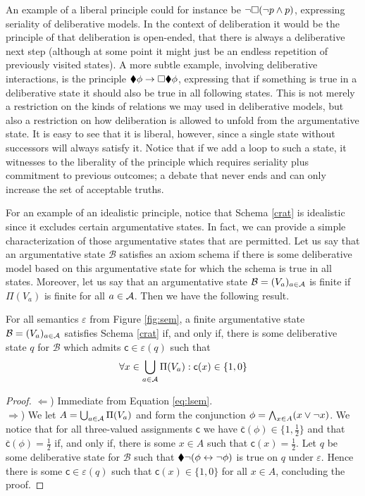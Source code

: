 \documentclass[greybox]{svmult}
\renewcommand{\bar}[1]{\overline{#1}}
\newcommand{\clab}{\mathsf c}
\newcommand{\views}{\mathcal B}
\newcommand{\sem}{\varepsilon}
\begin{document}
An example of a liberal principle could for instance be $\neg \square (\neg p \land p)$, expressing seriality of deliberative models. In the context of deliberation it would be the principle of that deliberation is open-ended, that there is always a deliberative next step (although at some point it might just be an endless repetition of previously visited states). A more subtle example, involving deliberative interactions, is the principle $\blacklozenge \phi \to \square \blacklozenge \phi$, expressing that if something is true in a deliberative state it should also be true in all following states. This is not merely a restriction on the kinds of relations we may used in deliberative models, but also a restriction on how deliberation is allowed to unfold from the argumentative state. It is easy to see that it is liberal, however, since a single state without successors will always satisfy it. Notice that if we add a loop to such a state, it witnesses to the liberality of the principle which requires seriality plus commitment to previous outcomes; a debate that never ends and can only increase the set of acceptable truths.

For an example of an idealistic principle, notice that Schema \ref{crat} is idealistic since it excludes certain argumentative states. In fact, we can provide a simple characterization of those argumentative states that are permitted. Let us say that an argumentative state $\views$ satisfies an axiom schema if there is some deliberative model based on this argumentative state for which the schema is true in all states. Moreover, let us say that an argumentative state $\views = (V_a)_{a \in \agents}$ is finite if $\Pi(V_a)$ is finite for all $a \in \mathcal A$. Then we have the following result.

\begin{theorem}\label{thm:1}
For all semantics $\sem$ from Figure \ref{fig:sem}, a finite argumentative state $\views = (V_a)_{a \in \agents}$ satisfies Schema \ref{crat} if, and only if, there is some deliberative state $q$ for $\views$ which admits $\clab \in \sem(q)$ such that
$$
\forall x \in \bigcup_{a \in \agents}\Pi(V_a): \clab(x) \in \{1,0\}
$$
\end{theorem}

\begin{proof}
$\Leftarrow$) Immediate from Equation \ref{eq:lsem}. \\
$\Rightarrow$) We let $A = \bigcup_{a \in \mathcal A}\Pi(V_a)$ and form the conjunction $\phi = \bigwedge_{x \in A}(x \lor \neg x)$. We notice that for all three-valued assignments $\clab$ we have $\bar \clab(\phi) \in \{1,\frac{1}{2}\}$ and that $\bar \clab(\phi) = \frac{1}{2}$ if, and only if, there is some $x \in A$ such that $\clab(x) = \frac{1}{2}$. Let $q$ be some deliberative state for $\views$ such that $\blacklozenge \neg (\phi \leftrightarrow \neg \phi)$ is true on 
$q$ under $\sem$. Hence there is some $\clab \in \sem(q)$ such that $\clab(x) \in \{1,0\}$ for all $x \in A$, concluding the proof.
\end{proof}
\end{document}

